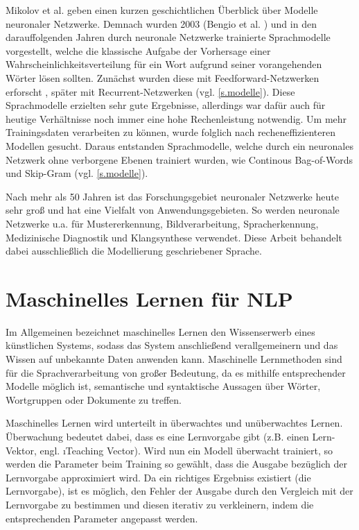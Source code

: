
Mikolov et al. \citep{Mikolov2012} geben einen kurzen geschichtlichen Überblick über Modelle neuronaler Netzwerke. Demnach wurden 2003 (Bengio et al. \citep{Bengio2003}) und in den darauffolgenden Jahren durch neuronale Netzwerke trainierte Sprachmodelle vorgestellt, welche die klassische Aufgabe der Vorhersage einer Wahrscheinlichkeitsverteilung für ein Wort aufgrund seiner vorangehenden Wörter lösen sollten. Zunächst wurden diese mit Feedforward-Netzwerken erforscht \citep{Bengio2003}, später mit Recurrent-Netzwerken \citep{Mikolov2010} (vgl. \autoref{s.modelle}). Diese Sprachmodelle erzielten sehr gute Ergebnisse, allerdings war dafür auch für heutige Verhältnisse noch immer eine hohe Rechenleistung notwendig. Um mehr Trainingsdaten verarbeiten zu können, wurde folglich nach recheneffizienteren Modellen gesucht. Daraus entstanden Sprachmodelle, welche durch ein neuronales Netzwerk ohne verborgene Ebenen trainiert wurden, wie Continous Bag-of-Words und Skip-Gram (vgl. \autoref{s.modelle}).

Nach mehr als 50 Jahren ist das Forschungsgebiet neuronaler Netzwerke heute sehr groß und hat eine Vielfalt von Anwendungsgebieten. So werden neuronale Netzwerke u.a. für Mustererkennung, Bildverarbeitung, Spracherkennung, Medizinische Diagnostik und Klangsynthese verwendet. Diese Arbeit behandelt dabei ausschließlich die Modellierung geschriebener Sprache.

\section{Maschinelles Lernen für NLP}\label{s.maschinelleslernen}
Im Allgemeinen bezeichnet maschinelles Lernen den Wissenserwerb eines künstlichen Systems, sodass das System anschließend verallgemeinern und das Wissen auf unbekannte Daten anwenden kann. Maschinelle Lernmethoden sind für die Sprachverarbeitung von großer Bedeutung, da es mithilfe entsprechender Modelle möglich ist, semantische und syntaktische Aussagen über Wörter, Wortgruppen oder Dokumente zu treffen.

Maschinelles Lernen wird unterteilt in überwachtes und unüberwachtes Lernen. Überwachung bedeutet dabei, dass es eine Lernvorgabe gibt (z.B. einen Lern-Vektor, engl. \i{Teaching Vector}). Wird nun ein Modell überwacht trainiert, so werden die Parameter beim Training so gewählt, dass die Ausgabe bezüglich der Lernvorgabe approximiert wird. Da ein richtiges Ergebniss existiert (die Lernvorgabe), ist es möglich, den Fehler der Ausgabe durch den Vergleich mit der Lernvorgabe zu bestimmen und diesen iterativ zu verkleinern, indem die entsprechenden Parameter angepasst werden.

